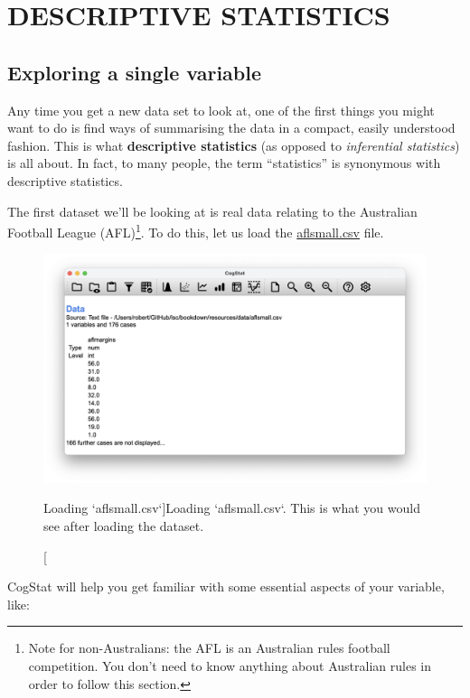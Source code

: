 \documentclass[
]{book}
\theoremstyle{definition}
\theoremstyle{definition}
\theoremstyle{definition}
\theoremstyle{definition}
\theoremstyle{remark}
\begin{document}
\hypertarget{part-descriptive-statistics}{%
\part*{DESCRIPTIVE STATISTICS}\label{part-descriptive-statistics}}

\hypertarget{exploringavariable}{%
\chapter{Exploring a single variable}\label{exploringavariable}}

Any time you get a new data set to look at, one of the first things you might want to do is find ways of summarising the data in a compact, easily understood fashion. This is what \textbf{descriptive statistics} (as opposed to \emph{inferential statistics}) is all about. In fact, to many people, the term ``statistics'' is synonymous with descriptive statistics.

The first dataset we'll be looking at is real data relating to the Australian Football League (AFL)\footnote{Note for non-Australians: the AFL is an Australian rules football competition. You don't need to know anything about Australian rules in order to follow this section.}. To do this, let us load the \href{resources/data/aflsmall.csv}{aflsmall.csv} file.

\begin{figure}

{\centering \includegraphics[width=0.66\linewidth]{resources/image/loadaflsmall} 

}

\caption[Loading `aflsmall.csv`]{Loading `aflsmall.csv`. This is what you would see after loading the dataset.}\label{fig:loadaflsmall}
\end{figure}

CogStat will help you get familiar with some essential aspects of your variable, like:
\end{document}
